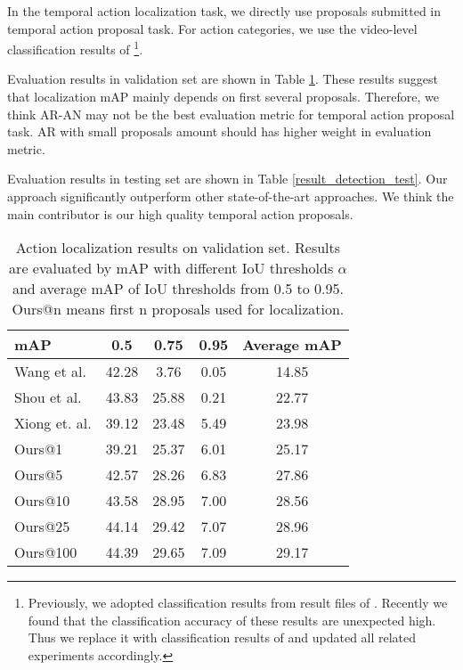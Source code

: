 \documentclass[10pt,twocolumn,letterpaper]{article}
\begin{document}
In the temporal action localization task, we directly use  proposals submitted in temporal action proposal task. For action categories, we use the video-level classification results of \cite{zhao2017cuhk}\footnote{Previously, we adopted classification results from result files of \cite{wang2016uts}. Recently we found that the classification accuracy of these results are unexpected high. Thus we replace it with classification results of \cite{zhao2017cuhk} and updated all related experiments accordingly.}. 

Evaluation results in validation set are shown in Table \ref{result_detection_val}. These results suggest that localization mAP  mainly depends on first several proposals. Therefore, we think AR-AN may not be the best evaluation metric for temporal action proposal task. AR with small proposals amount should has higher weight in evaluation metric.

Evaluation results in testing set are shown in Table \ref{result_detection_test}. Our approach significantly outperform other state-of-the-art approaches. We think the main contributor is our high quality temporal action proposals.

\begin{table}[tbp]

\centering
\caption{Action localization results on validation set. Results are evaluated by mAP with different IoU thresholds $\alpha$ and average mAP of IoU thresholds from 0.5 to 0.95. Ours@n means first n  proposals used for localization.}
\small
\begin{tabular}{p{2.2cm}<{\centering}|ccc|c<{\centering}}
\toprule
mAP  & 0.5  &  0.75  & 0.95  & Average mAP  \\
\hline Wang et al. \cite{wang2016uts}    & 42.28 & 3.76  & 0.05   & 14.85  \\
Shou et al. \cite{shou2017cdc}    & 43.83  & 25.88  & 0.21   & 22.77  \\
Xiong et. al. \cite{xiong2017pursuit}    & 39.12 & 23.48  & 5.49  & 23.98  \\
Ours@1   & 39.21  & 25.37  & 6.01   & 25.17  \\
Ours@5   & 42.57  & 28.26  & 6.83  & 27.86 \\
Ours@10 & 43.58   & 28.95  & 7.00  & 28.56 \\
Ours@25 & 44.14   & 29.42  & 7.07  & 28.96 \\
Ours@100 & 44.39   & 29.65  & 7.09  & 29.17 \\
\bottomrule
\end{tabular}
\label{result_detection_val}
\normalsize
\end{table}
\end{document}
